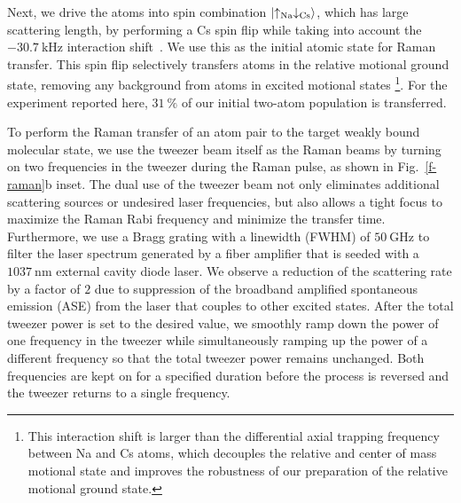 \documentclass[aps,prl,twocolumn,10pt,superscriptaddress]{revtex4-1}
\newcommand{\Na}{\mathrm{Na}}
\newcommand{\Cs}{\mathrm{Cs}}
\newcommand{\todo}[1]{}
\begin{document}
Next, we drive the atoms into spin combination $\ket{\uparrow_{\Na} \downarrow_{\Cs}}$,
which has large scattering length,
by performing a Cs spin flip while taking into account
the $-30.7~\mathrm{kHz}$ interaction shift~\cite{Hood2019}.
We use this as the initial atomic state for Raman transfer.
This spin flip selectively transfers atoms in the relative motional ground state,
removing any background from atoms in excited motional states
\footnote{This interaction shift is larger than the differential axial trapping frequency
  between Na and Cs atoms, which decouples the relative and center of mass motional state
  and improves the robustness of our preparation of the relative motional ground state.}.
For the experiment reported here,
$31~\mathrm{\%}$ of our initial two-atom population is transferred.

To perform the Raman transfer of an atom pair to the target weakly bound molecular state,
we use the tweezer beam itself as the Raman beams by turning on two frequencies
in the tweezer during the Raman pulse, as shown in Fig.~\ref{f-raman}b inset.
The dual use of the tweezer beam not only eliminates additional scattering sources
or undesired laser frequencies,
but also allows a tight focus to maximize the Raman Rabi frequency
and minimize the transfer time.
Furthermore, we use a Bragg grating with a linewidth (FWHM) of $50~\mathrm{GHz}$
to filter the laser spectrum generated by a fiber amplifier
that is seeded with a $1037~\mathrm{nm}$ external cavity diode laser.
We observe a reduction of the scattering rate by a factor of $2$
due to suppression of the broadband amplified spontaneous emission (ASE) from the laser
that couples to other excited states.
After the total tweezer power is set to the desired value,
we smoothly ramp down the power of one frequency in the tweezer
while simultaneously ramping up the power of a different frequency
so that the total tweezer power remains unchanged.
Both frequencies are kept on for a specified duration before the process is reversed
and the tweezer returns to a single frequency.
\end{document}
